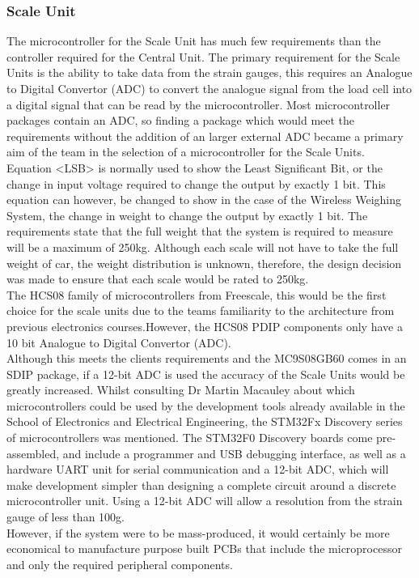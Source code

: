 \subsubsection{Scale Unit}
The microcontroller for the Scale Unit has much few requirements than the controller required for the Central Unit. The primary requirement for the Scale Units is the ability to take data from the strain gauges, this requires an Analogue to Digital Convertor (ADC) to convert the analogue signal from the load cell into a digital signal that can be read by the microcontroller. Most microcontroller packages contain an ADC, so finding a package which would meet the requirements without the addition of an larger external ADC became a primary aim of the team in the selection of a microcontroller for the Scale Units. \\
Equation <LSB> is normally used to show the Least Significant Bit, or the change in input voltage required to change the output by exactly 1 bit. This equation can however, be changed to show in the case of the Wireless Weighing System, the change in weight to change the output by exactly 1 bit.
The requirements state that the full weight that the system is required to measure will be a maximum of 250kg. Although each scale will not have to take the full weight of car, the weight distribution is unknown, therefore, the design decision was made to ensure that each scale would be rated to 250kg.  \\
The HCS08 family of microcontrollers from Freescale, this would be the first choice for the scale units due to the teams familiarity to the architecture from previous electronics courses.However, the HCS08 PDIP components only have a 10 bit Analogue to Digital Convertor (ADC).   \\
Although this meets the clients requirements and the MC9S08GB60 comes in an SDIP package, if a 12-bit ADC is used the accuracy of the Scale Units would be greatly increased. Whilst consulting Dr Martin Macauley about which microcontrollers could be used by the development tools already available in the School of Electronics and Electrical Engineering, the STM32Fx Discovery series of microcontrollers was mentioned. The STM32F0 Discovery boards come pre-assembled, and include a programmer and USB debugging interface, as well as a hardware UART unit for serial communication and a 12-bit ADC, which will make development simpler than designing a complete circuit around a discrete microcontroller unit.  Using a 12-bit ADC will allow a resolution from the strain gauge of less than 100g. \\
However, if the system were to be mass-produced, it would certainly be more economical to manufacture purpose built PCBs that include the microprocessor and only the required peripheral components. \\
